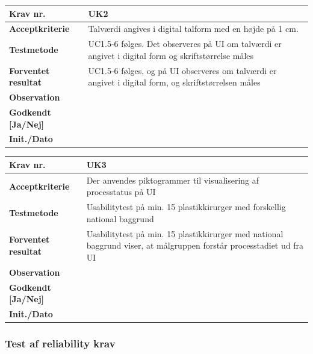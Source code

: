 \begin{tabularx}{1\textwidth}{|l|X|}
\hline
\textbf{Krav nr.}              & UK2  \\ \hline
\textbf{Acceptkriterie}        & Talværdi angives i digital talform med en højde på 1 cm. \\ \hline
\textbf{Testmetode}            & UC1.5-6 følges. Det observeres på UI om talværdi er angivet i digital form og skriftstørrelse måles \\ \hline
\textbf{Forventet resultat}	& UC1.5-6 følges, og på UI observeres om talværdi er angivet i digital form, og skriftstørrelsen måles \\ \hline  
\textbf{Observation}           &  \\ \hline
\textbf{Godkendt {[}Ja/Nej{]}} &  \\ \hline
\textbf{Init./Dato}            &  \\ \hline
\end{tabularx}

\begin{tabularx}{1\textwidth}{|l|X|}
\hline
\textbf{Krav nr.}              & UK3  \\ \hline
\textbf{Acceptkriterie}        & Der anvendes piktogrammer til visualisering af processtatus på UI \\ \hline
\textbf{Testmetode}            & Usabilitytest på min. 15 plastikkirurger med forskellig national baggrund \\ \hline
\textbf{Forventet resultat}		& Usabilitytest på min. 15 plastikkirurger med national baggrund viser, at målgruppen forstår processtadiet ud fra UI\\ \hline
\textbf{Observation}           &  \\ \hline
\textbf{Godkendt {[}Ja/Nej{]}} &  \\ \hline
\textbf{Init./Dato}            &  \\ \hline
\end{tabularx}


\vspace{5mm}

\subsubsection{Test af reliability krav}

